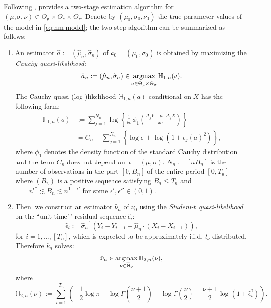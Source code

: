 Following \citet{masuda2023quasilikelihood},  provides a two-stage estimation algorithm for \(\left(\mu, \sigma, \nu\right)\in \Theta_\mu\times\Theta_\sigma\times \Theta_\nu\).
Denote by \((\mu_0,\sigma_0,\nu_0)\) the true parameter values of the model in \eqref{eq:hm-model};
the two-step algorithm can be summarized as follows:

\begin{enumerate}
\def\labelenumi{\arabic{enumi}.}
\item
  An estimator \(\hat{a}:=(\hat{\mu}_{n},\hat{\sigma}_{n})\) of \(a_0=(\mu_0,\sigma_0)\) is obtained by maximizing the \textit{Cauchy quasi-likelihood}:
  \begin{equation}
  \hat{a}_n:=(\hat{\mu}_{n},\hat{\sigma}_{n})\in\mathop{\rm argmax}_{a\in \overline{\Theta_\mu\times\Theta_\sigma}}\mathbb{H}_{1,n}(a).
  \label{hm:def_CQMLE}
  \end{equation}
  The Cauchy quasi-(log-)likelihood \(\mathbb{H}_{1,n}(a)\) conditional on \(X\) has the following form:
  \begin{align}
  \mathbb{H}_{1,n}(a)
  &:= \sum_{j=1}^{N_n} \log\left\{\frac{1}{h\sigma}\phi_1\left( \frac{\Delta_j Y - \mu\cdot \Delta_j X}{h\sigma} \right)\right\}
  \nonumber\\
  &= C_n - \sum_{j=1}^{N_n} \left\{ \log\sigma+ \log\left(1+\epsilon_j(a)^2\right)\right\},
  \nonumber
  \end{align}
  where \(\phi_1\) denotes the density function of the standard Cauchy distribution and the term \(C_n\) does not depend on \(a=\left(\mu,\sigma\right)\). \(N_n:=[n B_n]\) is the number of observations in the part \([0,B_n]\) of the entire period \([0, T_n]\) where \((B_n)\) is a positive sequence satisfying \(B_n\le T_n\) and \(\qquad n^{\epsilon''} \lesssim B_n \lesssim n^{1-\epsilon'}\) for some \(\epsilon',\epsilon''\in(0,1)\).
\item
  Then, we construct an estimator \(\hat{\nu}_{n}\) of \(\nu_0\) using the \textit{Student-$t$ quasi-likelihood} on the ``unit-time'\,' residual sequence \(\hat{\epsilon}_i\):
  \begin{equation*}
  \hat{\epsilon}_i := \hat{\sigma}_{n}^{-1}\left(Y_i - Y_{i-1} - \hat{\mu}_{n}\cdot(X_i - X_{i-1})\right),
  \end{equation*}
  for \(i=1,\dots,[T_n]\), which is expected to be approximately i.i.d. \(t_\nu\)-distributed. Therefore \(\hat{\nu}_{n}\) solves:
  \begin{equation*}
  \hat{\nu}_{n}\in\mathop{\rm argmax}_{\nu\in\overline{\Theta}_\nu}\mathbb{H}_{2,n}(\nu),
  \end{equation*}
  where
  \begin{equation*}
  \mathbb{H}_{2,n}(\nu) :=  \sum_{i=1}^{[T_n]}\left( -\frac12 \log\pi + \log\Gamma\left(\frac{\nu+1}{2}\right) - \log\Gamma\left(\frac{\nu}{2}\right) - \frac{\nu+1}{2}\log\left( 1+ \hat{\epsilon}_i^2\right) \right).
  \end{equation*}
\end{enumerate}

